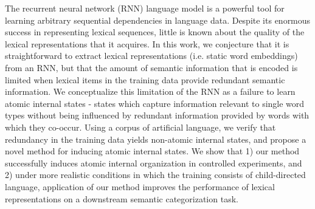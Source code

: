 The recurrent neural network (RNN) language model is a powerful tool for learning arbitrary sequential dependencies in language data. Despite its enormous success in representing lexical sequences, little is known about the quality of the lexical representations that it acquires. In this work, we conjecture that it is straightforward to extract lexical representations (i.e. static word embeddings) from an RNN, but that the amount of semantic information that is encoded is limited when lexical items in the training data provide redundant semantic information. We conceptualize this limitation of the RNN as a failure to learn atomic internal states - states which capture information relevant to single word types without being influenced by redundant information provided by words with which they co-occur. Using a corpus of artificial language, we verify that redundancy in the training data yields non-atomic internal states, and propose a novel method for inducing atomic internal states. We show that 1) our method successfully induces atomic internal organization in controlled experiments, and 2) under more realistic conditions in which the training consists of child-directed language, application of our method improves the performance of lexical representations on a downstream semantic categorization task.
